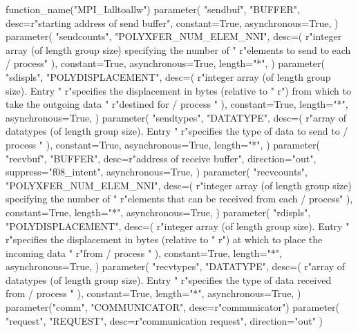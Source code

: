 \begin{mpi-binding}
    function_name("MPI_Ialltoallw")
    parameter(
        "sendbuf",
        "BUFFER",
        desc=r"starting address of send buffer",
        constant=True,
        asynchronous=True,
    )
    parameter(
        "sendcounts",
        "POLYXFER_NUM_ELEM_NNI",
        desc=(
            r"integer array (of length group size) specifying the number of "
            r"elements to send to each \MPI/ process"
        ),
        constant=True,
        asynchronous=True,
        length="*",
    )
    parameter(
        "sdispls",
        "POLYDISPLACEMENT",
        desc=(
            r"integer array (of length group size). Entry  "
            r"specifies the displacement in bytes (relative to "
            r") from which to take the outgoing data "
            r"destined for \MPI/ process "
        ),
        constant=True,
        length="*",
        asynchronous=True,
    )
    parameter(
        "sendtypes",
        "DATATYPE",
        desc=(
            r"array of datatypes (of length group size). Entry  "
            r"specifies the type of data to send to \MPI/ process "
        ),
        constant=True,
        asynchronous=True,
        length="*",
    )
    parameter(
        "recvbuf",
        "BUFFER",
        desc=r"address of receive buffer",
        direction="out",
        suppress="f08_intent",
        asynchronous=True,
    )
    parameter(
        "recvcounts",
        "POLYXFER_NUM_ELEM_NNI",
        desc=(
            r"integer array (of length group size) specifying the number of "
            r"elements that can be received from each \MPI/ process"
        ),
        constant=True,
        length="*",
        asynchronous=True,
    )
    parameter(
        "rdispls",
        "POLYDISPLACEMENT",
        desc=(
            r"integer array (of length group size). Entry  "
            r"specifies the displacement in bytes (relative to "
            r") at which to place the incoming data "
            r"from \MPI/ process "
        ),
        constant=True,
        length="*",
        asynchronous=True,
    )
    parameter(
        "recvtypes",
        "DATATYPE",
        desc=(
            r"array of datatypes (of length group size). Entry  "
            r"specifies the type of data received from \MPI/ process "
        ),
        constant=True,
        length="*",
        asynchronous=True,
    )
    parameter("comm", "COMMUNICATOR", desc=r"communicator")
    parameter(
        "request", "REQUEST", desc=r"communication request", direction="out"
    )
\end{mpi-binding}

